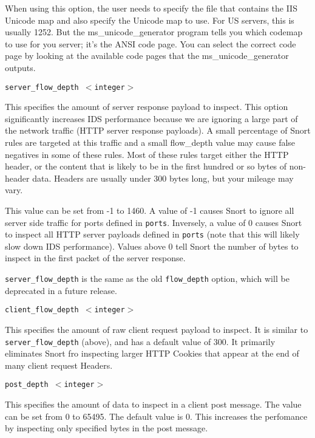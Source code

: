 \documentclass[english]{report}
\newcounter{slistnum}
\newenvironment{slist}
{ \begin{list}{ {\bf \arabic{slistnum}.} }{\usecounter{slistnum} } }
{ \end{list} }
\newenvironment{note}{
\samepage
    \vspace{10pt}{\textsf{
        {\hspace{7pt}\Huge{$\triangle$\hspace{-12.5pt}{\Large{$^!$}}}}\hspace{5pt}
        {\Large{NOTE}}
    }
    }
   \begin{center}
    \par\vspace{-17pt}

    \begin{lrbox}{\savepar}
    \begin{minipage}[r]{6in}
}
{
    \end{minipage}
    \end{lrbox}
    \fbox{
        \usebox{
            \savepar
	}
    }
    \par\vskip10pt
    \end{center}
}
\newenvironment{note}{
        \begin{rawhtml}
        <p><table border="1"><tr><td><b>
        Note:&nbsp;&nbsp;</b>
        \end{rawhtml}
}{
        \begin{rawhtml}
        </b></td></tr></table></p>
        \end{rawhtml}
}
\begin{document}
\begin{slist}
When using this option, the user needs to specify the file that contains the
IIS Unicode map and also specify the Unicode map to use.  For US servers, this
is usually 1252.  But the ms\_unicode\_generator program tells you which
codemap to use for you server; it's the ANSI code page.  You can select the
correct code page by looking at the available code pages that the
ms\_unicode\_generator outputs.

\item \texttt{server\_flow\_depth $<$integer$>$}

This specifies the amount of server response payload to inspect.  This option
significantly increases IDS performance because we are ignoring a large part of
the network traffic (HTTP server response payloads).  A small percentage of
Snort rules are targeted at this traffic and a small flow\_depth value may
cause false negatives in some of these rules.  Most of these rules target
either the HTTP header, or the content that is likely to be in the first
hundred or so bytes of non-header data.  Headers are usually under 300 bytes
long, but your mileage may vary.

This value can be set from -1 to 1460. A value of -1 causes Snort to ignore all
server side traffic for ports defined in \texttt{ports}.  Inversely, a value of
0 causes Snort to inspect all HTTP server payloads defined in \texttt{ports}
(note that this will likely slow down IDS performance).  Values above 0 tell
Snort the number of bytes to inspect in the first packet of the server
response.

\begin{note}

\texttt{server\_flow\_depth} is the same as the old \texttt{flow\_depth}
option, which will be deprecated in a future release.

\end{note}

\item \texttt{client\_flow\_depth $<$integer$>$}

This specifies the amount of raw client request payload to inspect.  It is
similar to \texttt{server\_flow\_depth} (above), and has a default value of
300.  It primarily eliminates Snort fro inspecting larger HTTP Cookies that
appear at the end of many client request Headers.

\item \texttt{post\_depth $<$integer$>$}

This specifies the amount of data to inspect in a client post message. The 
value can be set from 0 to 65495. The default value is 0. This increases the 
perfomance by inspecting only specified bytes in the post message.


\end{slist}
\end{document}
